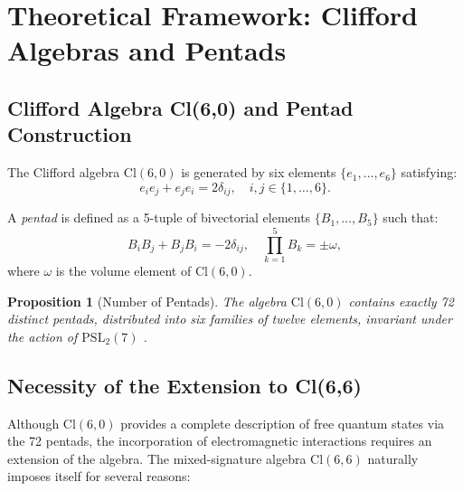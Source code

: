 \documentclass[11pt,a4paper]{article}
\theoremstyle{plain}
\newtheorem{proposition}{Proposition}[section]
\theoremstyle{definition}
\theoremstyle{remark}
\begin{document}
\section{Theoretical Framework: Clifford Algebras and Pentads}
\label{sec:theory}

\subsection{Clifford Algebra Cl(6,0) and Pentad Construction}

The Clifford algebra $\mathrm{Cl}(6,0)$ is generated by six elements $\{e_1,\dots,e_6\}$ satisfying:
\begin{equation}
  e_i e_j + e_j e_i = 2\delta_{ij}, \quad i,j \in \{1,\dots,6\}.
\end{equation}

A \textit{pentad} is defined as a 5-tuple of bivectorial elements $\{B_1,\dots,B_5\}$ such that:
\begin{equation}
  B_i B_j + B_j B_i = -2\delta_{ij}, \quad \prod_{k=1}^5 B_k = \pm \omega,
\end{equation}
where $\omega$ is the volume element of $\mathrm{Cl}(6,0)$.

\begin{proposition}[Number of Pentads]
  The algebra $\mathrm{Cl}(6,0)$ contains exactly 72 distinct pentads, distributed into six families of twelve elements, invariant under the action of $\mathrm{PSL}_2(7)$ \cite{rowlands2015foundations}.
\end{proposition}

\subsection{Necessity of the Extension to Cl(6,6)}

Although $\mathrm{Cl}(6,0)$ provides a complete description of free quantum states via the 72 pentads, the incorporation of electromagnetic interactions requires an extension of the algebra. The mixed-signature algebra $\mathrm{Cl}(6,6)$ naturally imposes itself for several reasons:
\end{document}
